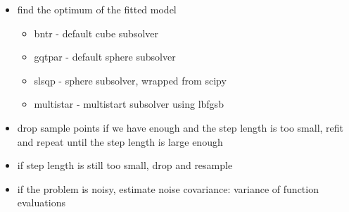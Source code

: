 \begin{itemize}
\begin{itemize}
        \end{itemize}
   \item find the optimum of the fitted model
        \begin{itemize}
            \item bntr - default cube subsolver
            \item gqtpar - default sphere subsolver
            \item slsqp - sphere subsolver, wrapped from scipy
            \item multistar - multistart subsolver using lbfgsb
        \end{itemize}
   \item drop sample points if we have enough  and the step length is too small, refit and repeat until the step length is large enough
   \item if step length is still too small, drop and resample
   \item if the problem is noisy, estimate noise covariance: variance of function evaluations


\end{itemize}
